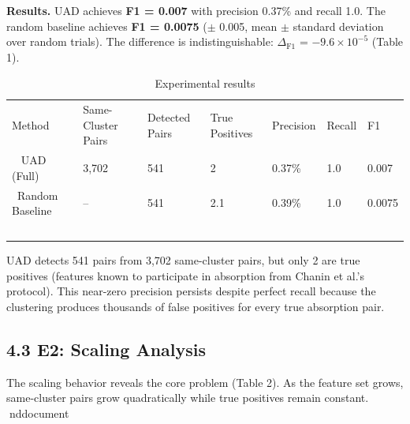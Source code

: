 \documentclass{article}
\begin{document}
\textbf{Results.} UAD achieves \textbf{F1 = 0.007} with precision 0.37\% and recall 1.0. The random baseline achieves \textbf{F1 = 0.0075} ($\pm$ 0.005, mean $\pm$ standard deviation over random trials). The difference is indistinguishable: $\Delta_{\text{F1}}$ = $-9.6 \times 10^{-5}$ (Table 1).

\begin{table}[ht]
\centering
\small
\begin{tabular}{lllllll}
\toprule
Method & Same-Cluster Pairs & Detected Pairs & True Positives & Precision & Recall & F1 \\\
\midrule
UAD (Full) & 3,702 & 541 & 2 & 0.37\% & 1.0 & 0.007 \\\
Random Baseline & -- & 541 & 2.1 & 0.39\% & 1.0 & 0.0075 \\\
\bottomrule
\end{tabular}
\caption{Experimental results}
\end{table}

UAD detects 541 pairs from 3,702 same-cluster pairs, but only 2 are true positives (features known to participate in absorption from Chanin et al.'s protocol). This near-zero precision persists despite perfect recall because the clustering produces thousands of false positives for every true absorption pair.

\subsection{4.3 E2: Scaling Analysis}

The scaling behavior reveals the core problem (Table 2). As the feature set grows, same-cluster pairs grow quadratically while true positives remain constant.
nd{document}
\end{document}
